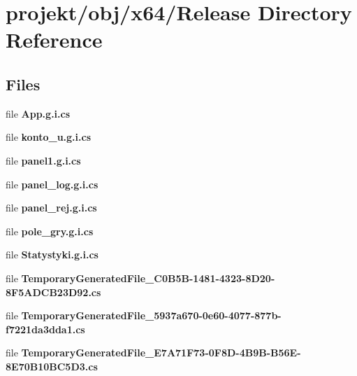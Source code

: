 \section{projekt/obj/x64/\+Release Directory Reference}
\label{dir_c6f116eccf4bab0b4597302bd44472ec}
\subsection*{Files}
\begin{DoxyCompactItemize}
\item 
file \textbf{ App.\+g.\+i.\+cs}
\item 
file \textbf{ konto\+\_\+u.\+g.\+i.\+cs}
\item 
file \textbf{ panel1.\+g.\+i.\+cs}
\item 
file \textbf{ panel\+\_\+log.\+g.\+i.\+cs}
\item 
file \textbf{ panel\+\_\+rej.\+g.\+i.\+cs}
\item 
file \textbf{ pole\+\_\+gry.\+g.\+i.\+cs}
\item 
file \textbf{ Statystyki.\+g.\+i.\+cs}
\item 
file \textbf{ Temporary\+Generated\+File\+\_\+C0\+B5\+B-\/1481-\/4323-\/8\+D20-\/8\+F5\+A\+D\+C\+B23\+D92.\+cs}
\item 
file \textbf{ Temporary\+Generated\+File\+\_\+5937a670-\/0e60-\/4077-\/877b-\/f7221da3dda1.\+cs}
\item 
file \textbf{ Temporary\+Generated\+File\+\_\+\+E7\+A71\+F73-\/0\+F8\+D-\/4\+B9\+B-\/\+B56\+E-\/8\+E70\+B10\+B\+C5\+D3.\+cs}
\end{DoxyCompactItemize}
